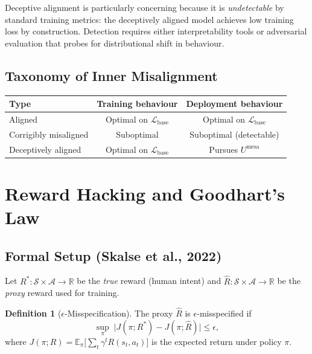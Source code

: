 \documentclass[11pt,a4paper]{article}
\theoremstyle{definition}
\newtheorem{definition}[theorem]{Definition}
\newcommand{\E}{\mathbb{E}}
\newcommand{\R}{\mathbb{R}}
\begin{document}
\begin{dangerbox}
Deceptive alignment is particularly concerning because it is
\emph{undetectable} by standard training metrics: the deceptively
aligned model achieves low training loss by construction. Detection
requires either interpretability tools or adversarial evaluation that
probes for distributional shift in behaviour.
\end{dangerbox}

\subsection{Taxonomy of Inner Misalignment}

\begin{center}
\begin{tabular}{lcc}
\toprule
\textbf{Type} & \textbf{Training behaviour} & \textbf{Deployment behaviour} \\
\midrule
Aligned & Optimal on $\mathcal{L}_{\text{base}}$ & Optimal on $\mathcal{L}_{\text{base}}$ \\
Corrigibly misaligned & Suboptimal & Suboptimal (detectable) \\
Deceptively aligned & Optimal on $\mathcal{L}_{\text{base}}$ & Pursues $U^{\text{mesa}}$ \\
\bottomrule
\end{tabular}
\end{center}

\section{Reward Hacking and Goodhart's Law}\label{sec:reward_hacking}

\subsection{Formal Setup (Skalse et al., 2022)}

Let $R^*: \mathcal{S} \times \mathcal{A} \to \R$ be the \emph{true}
reward (human intent) and $\hat{R}: \mathcal{S} \times \mathcal{A} \to
\R$ be the \emph{proxy} reward used for training.

\begin{definition}[$\epsilon$-Misspecification]
The proxy $\hat{R}$ is $\epsilon$-misspecified if
\begin{equation}
  \sup_{\pi}\;\big|
    J(\pi; R^*) - J(\pi; \hat{R})
  \big| \leq \epsilon,
\end{equation}
where $J(\pi; R) = \E_\pi\!\big[\sum_t \gamma^t R(s_t, a_t)\big]$ is
the expected return under policy $\pi$.
\end{definition}
\end{document}
